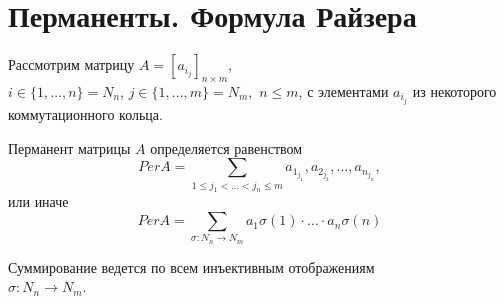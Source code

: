 \section{Перманенты. Формула Райзера}

Рассмотрим матрицу $A=[a_{i_j}]_{n \times m}$, \\ $i\in\{1,\ldots,n\}=N_n$,
 $j \in \{1,\ldots,m\}=N_m,$ $n \leq m$, с элементами $a_{i_j}$ из некоторого коммутационного кольца.

\opr Перманент матрицы $A$ определяется равенством
$$
Per A = \sum_{1\leq j_1<\ldots<j_n\leq m} a_{1_{j_1}}, a_{2_{j_2}}, \ldots, a_{n_{j_n}},
$$
или иначе 
$$
Per A = \sum_{\sigma:N_n \rightarrow N_m} a_1 \sigma(1) \cdot \ldots \cdot a_n \sigma(n)
$$

Суммирование ведется по всем инъективным отображениям \\ $\sigma:N_n \rightarrow N_m$.

